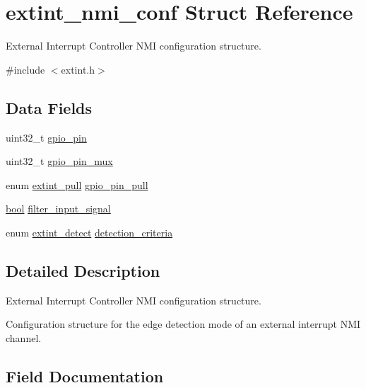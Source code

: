 \hypertarget{structextint__nmi__conf}{}\section{extint\+\_\+nmi\+\_\+conf Struct Reference}
\label{structextint__nmi__conf}


External Interrupt Controller N\+MI configuration structure.  




{\ttfamily \#include $<$extint.\+h$>$}

\subsection*{Data Fields}
\begin{DoxyCompactItemize}
\item 
uint32\+\_\+t \mbox{\hyperlink{structextint__nmi__conf_aaa3ba20871e508028b08eed10d08db84}{gpio\+\_\+pin}}
\item 
uint32\+\_\+t \mbox{\hyperlink{structextint__nmi__conf_ab223c84d8e5b59e9fcc8673c338a7a87}{gpio\+\_\+pin\+\_\+mux}}
\item 
enum \mbox{\hyperlink{group__asfdoc__sam0__extint__group_ga01b49a5a87ca71359c5a9bc2ee02853e}{extint\+\_\+pull}} \mbox{\hyperlink{structextint__nmi__conf_a2722ba2735f217f3c7e30f2e4135c134}{gpio\+\_\+pin\+\_\+pull}}
\item 
\mbox{\hyperlink{group__group__sam0__utils_ga97a80ca1602ebf2303258971a2c938e2}{bool}} \mbox{\hyperlink{structextint__nmi__conf_a1a59d546b8bc80f31e5350a490c5b718}{filter\+\_\+input\+\_\+signal}}
\item 
enum \mbox{\hyperlink{group__asfdoc__sam0__extint__group_ga920ab9931e047b548d07ad29dedfcca2}{extint\+\_\+detect}} \mbox{\hyperlink{structextint__nmi__conf_a275ebcf2d5de2b96132c05744345a34c}{detection\+\_\+criteria}}
\end{DoxyCompactItemize}


\subsection{Detailed Description}
External Interrupt Controller N\+MI configuration structure. 

Configuration structure for the edge detection mode of an external interrupt N\+MI channel. 

\subsection{Field Documentation}
\mbox{\label{structextint__nmi__conf_a275ebcf2d5de2b96132c05744345a34c}} 
